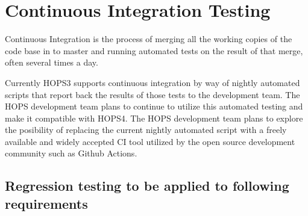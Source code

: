 %
%
\section{Continuous Integration Testing}
\label{sec:integration}

Continuous Integration is the process of merging all the working copies of the code
base in to master and running automated tests on the result of that merge, often 
several times a day.

Currently HOPS3 supports continuous integration by way of nightly automated scripts 
that report back the results of those tests to the development team.
The HOPS development team plans to continue to utilize this automated testing
and make it compatible with HOPS4. The HOPS development team plans to explore the posibility
of replacing the current nightly automated script with a freely available and widely
accepted CI tool utilized by the open source development community such as Github Actions. 

\subsection{Regression testing to be applied to following requirements}
\label{sec:integrationreqs}

